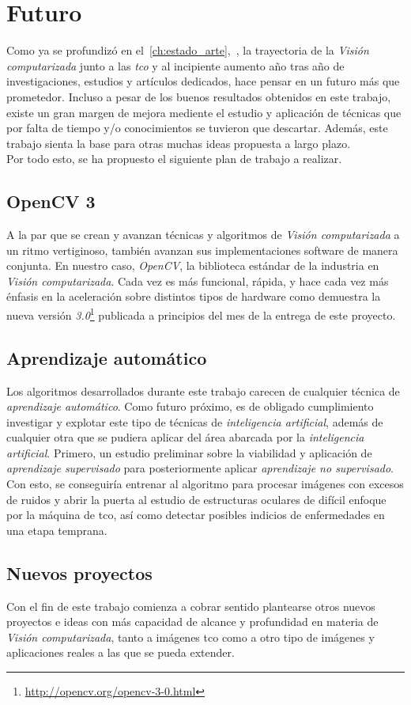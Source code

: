 \chapter{Futuro}
Como ya se profundizó en
el~\autoref{ch:estado_arte},~, la trayectoria
de la \emph{Visión computarizada} junto a las \emph{\gls{tco}} y al
incipiente aumento año tras año de investigaciones, estudios y
artículos dedicados, hace pensar en un futuro más que
prometedor. Incluso a pesar de los buenos resultados obtenidos en este
trabajo, existe un gran margen de mejora mediente el estudio y
aplicación de técnicas que por falta de tiempo y/o conocimientos se
tuvieron que descartar. Además, este trabajo sienta la base para otras
muchas ideas propuesta a largo plazo.\\
Por todo esto, se ha propuesto el siguiente plan de trabajo a
realizar.

\section{OpenCV 3}
A la par que se crean y avanzan técnicas y algoritmos de \emph{Visión
  computarizada} a un ritmo vertiginoso, también avanzan sus
implementaciones software de manera conjunta. En nuestro caso,
\emph{OpenCV}, la biblioteca estándar de la industria en \emph{Visión
  computarizada}. Cada vez es más funcional, rápida, y hace cada vez
más énfasis en la aceleración sobre distintos tipos de hardware
como demuestra la nueva versión
\emph{3.0}\footnote{\url{http://opencv.org/opencv-3-0.html}} publicada a
principios del mes de la entrega de este proyecto.

\section{Aprendizaje automático}
Los algoritmos desarrollados durante este trabajo carecen de cualquier
técnica de \emph{aprendizaje automático}. Como futuro próximo, es de
obligado cumplimiento investigar y explotar este tipo de técnicas de
\emph{inteligencia artificial}, además de cualquier otra que se pudiera
aplicar del área abarcada por la \emph{inteligencia
  artificial}. Primero, un estudio preliminar sobre la viabilidad y
aplicación de \emph{aprendizaje supervisado} para posteriormente
aplicar \emph{aprendizaje no supervisado}. Con esto, se conseguiría
entrenar al algoritmo para procesar imágenes con excesos de ruidos y
abrir la puerta al estudio de estructuras oculares de difícil enfoque
por la máquina de \gls{tco}, así como detectar posibles indicios de
enfermedades en una etapa temprana.

\section{Nuevos proyectos}
Con el fin de este trabajo comienza a cobrar sentido plantearse otros
nuevos proyectos e ideas con más capacidad de alcance y profundidad en
materia de \emph{Visión computarizada}, tanto a imágenes \gls{tco} como
a otro tipo de imágenes y aplicaciones reales a las que se pueda extender.
